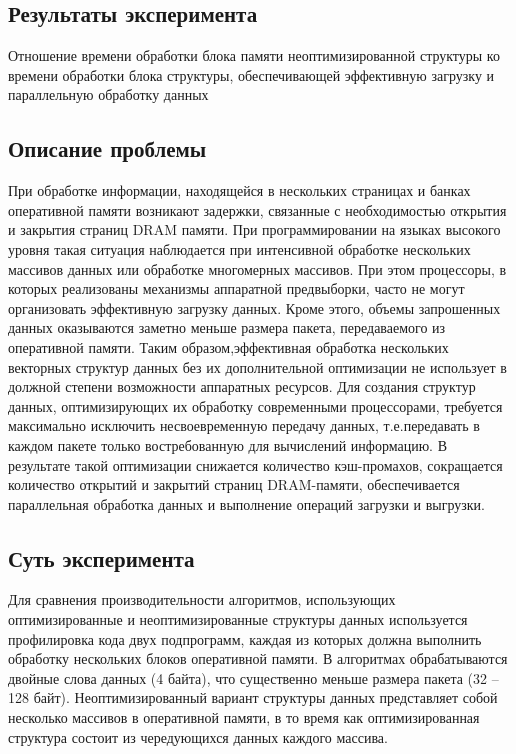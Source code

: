 \subsection{Результаты эксперимента}
Отношение   времени   обработки   блока   памяти неоптимизированной структуры ко времени обработки блока структуры, обеспечивающей эффективную загрузку и параллельную обработку данных


\subsection{Описание проблемы}
При   обработке информации, находящейся в нескольких страницах и банках оперативной памяти возникают задержки, связанные с необходимостью открытия и закрытия страниц DRAM памяти. При программировании на языках высокого уровня такая ситуация наблюдается при интенсивной обработке нескольких массивов данных   или   обработке   многомерных   массивов.   При   этом   процессоры,   в   которых реализованы   механизмы   аппаратной   предвыборки,   часто   не   могут   организовать эффективную загрузку данных. Кроме этого, объемы запрошенных данных оказываются заметно меньше размера пакета, передаваемого из оперативной памяти. Таким образом,эффективная обработка нескольких векторных структур данных без их дополнительной оптимизации не использует в должной степени возможности аппаратных ресурсов. Для создания структур данных, оптимизирующих их обработку   современными процессорами, требуется максимально исключить несвоевременную передачу данных, т.е.передавать в каждом пакете только востребованную для вычислений информацию. В результате   такой   оптимизации   снижается   количество   кэш-промахов,   сокращается количество открытий и закрытий страниц  DRAM-памяти, обеспечивается параллельная обработка данных и выполнение операций загрузки и выгрузки.

\subsection{Суть эксперимента}  
Для сравнения производительности алгоритмов, использующих оптимизированные и неоптимизированные структуры данных используется профилировка кода двух подпрограмм, каждая из которых должна выполнить обработку нескольких блоков оперативной памяти. В алгоритмах обрабатываются двойные слова данных (4 байта), что существенно меньше размера пакета (32 – 128 байт). Неоптимизированный вариант структуры данных представляет собой несколько массивов в оперативной памяти, в то время как оптимизированная структура состоит из чередующихся данных каждого массива. 


